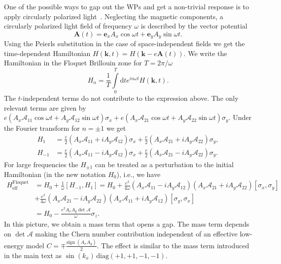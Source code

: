 \documentclass[aps,preprintnumbers,amsmath,amssymb]{revtex4-2}
\begin{document}
One of the possible ways to gap out the WPs and get a non-trivial response is to apply circularly polarized light~\cite{PhysRevB.79.081406, PhysRevB.84.235108}. Neglecting the magnetic components, a circularly polarized light field of frequency $\omega$ is described by the vector potential
\begin{equation}
    \mathbf{A}(t) = \mathbf{e}_x A_x  \cos \omega t + \mathbf{e}_y A_y\sin \omega t. 
\end{equation}
Using the Peierls substitution in the case of space-independent fields we get the time-dependent Hamiltonian $H(\mathbf{k},t)=H(\mathbf{k}-e\mathbf{A}(t))$.
We write the Hamiltonian in the Floquet Brillouin zone for $T=2\pi/\omega$
\begin{equation}
    H_n = \frac{1}{T}\int \limits^T_0 \text{d}t e^{in\omega t}H(\mathbf{k},t).
\end{equation}
The $t$-independent terms do not contribute to the expression above. The only relevant terms are given by $e(A_x \mathcal{A}_{11} \cos \omega t + A_y\mathcal{A}_{12}\sin \omega t)\sigma_x+e(A_x \mathcal{A}_{21} \cos \omega t + A_y\mathcal{A}_{22}\sin \omega t)\sigma_y$. Under the Fourier transform for $n=\pm1$ we get
\begin{align}
    H_{1} &=\frac{e}{2}(A_x \mathcal{A}_{11} +i A_y\mathcal{A}_{12})\sigma_x+\frac{e}{2}(A_x \mathcal{A}_{21}  +i A_y\mathcal{A}_{22})\sigma_y,\\
    H_{-1} &=\frac{e}{2}(A_x \mathcal{A}_{11} -i A_y\mathcal{A}_{12})\sigma_x+\frac{e}{2}(A_x \mathcal{A}_{21}  -i A_y\mathcal{A}_{22})\sigma_y.
\end{align}
For large frequencies the $H_{\pm1}$ can be treated as a perturbation to the initial Hamiltonian (in the new notation $H_0$), i.e., we have
\begin{align}
    H_{\text{eff}}^{\text{Floquet}} &= H_0 + \frac{1}{\omega} [H_{-1},H_1] =H_0 + \frac{e^2}{4\omega}(A_x \mathcal{A}_{11} -i A_y\mathcal{A}_{12})(A_x \mathcal{A}_{21}  +i A_y\mathcal{A}_{22}) [\sigma_x, \sigma_y]\\
    &+\frac{e^2}{4\omega}(A_x \mathcal{A}_{21}  -i A_y\mathcal{A}_{22})(A_x \mathcal{A}_{11} +i A_y\mathcal{A}_{12})[\sigma_y,\sigma_x]\\
    &=H_0 - \frac{e^2A_x A_y \det \mathcal{A}}{\omega}\sigma_z.
\end{align}
In this picture, we obtain a mass term that opens a gap. The mass term depends on $\det \mathcal{A}$ making the Chern number contribution independent of an effective low-energy model $C = \mp \tfrac{\text{sign } (A_x A_y)}{2}$. The effect is similar to the mass term introduced in the main text as $\sin(k_x)\, \text{diag} (+1, +1, -1, -1)$. 
\end{document}
